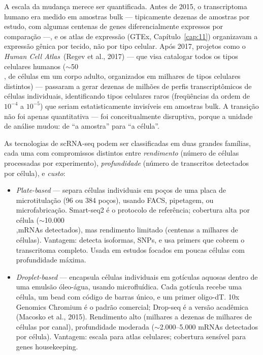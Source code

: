 A escala da mudança merece ser quantificada. Antes de 2015, o transcriptoma humano era medido em amostras bulk --- tipicamente dezenas de amostras por estudo, com algumas centenas de genes diferencialmente expressos por comparação ---, e os atlas de expressão (GTEx, Capítulo~\ref{cap:11}) organizavam a expressão gênica por tecido, não por tipo celular. Após 2017, projetos como o \emph{Human Cell Atlas}~(Regev et al., 2017) --- que visa catalogar todos os tipos celulares humanos (\(\sim\)50\\, de células em um corpo adulto, organizados em milhares de tipos celulares distintos) --- passaram a gerar dezenas de milhões de perfis transcriptômicos de células individuais, identificando tipos celulares raros (freqüências da ordem de \(10^{-4}\) a \(10^{-5}\)) que seriam estatisticamente invisíveis em amostras bulk. A transição não foi apenas quantitativa --- foi conceitualmente disruptiva, porque a unidade de análise mudou: de ``a amostra'' para ``a célula''.



As tecnologias de scRNA-seq podem ser classificadas em duas grandes famílias, cada uma com compromissos distintos entre \emph{rendimento} (número de células processadas por experimento), \emph{profundidade} (número de transcritos detectados por célula), e \emph{custo}:

\begin{definicaoenv}
\begin{itemize}
  \item \emph{Plate-based} --- separa células individuais em poços de uma placa de microtitulação (96 ou 384 poços), usando FACS, pipetagem, ou microfabricação. Smart-seq2 é o protocolo de referência; cobertura alta por célula (\(\sim\)10.000\\,mRNAs detectados), mas rendimento limitado (centenas a milhares de células). Vantagem: detecta isoformas, SNPs, e usa primers que cobrem o transcritoma completo. Usada em estudos focados em poucas células com profundidade máxima.
  \item \emph{Droplet-based} --- encapsula células individuais em gotículas aquosas dentro de uma emulsão óleo-água, usando microfluídica. Cada gotícula recebe uma célula, um bead com código de barras único, e um primer oligo-dT. 10x Genomics Chromium é o padrão comercial; Drop-seq é a versão acadêmica (Macosko et al., 2015). Rendimento alto (milhares a dezenas de milhares de células por canal), profundidade moderada (\(\sim\)2.000--5.000 mRNAs detectados por célula). Vantagem: escala para atlas celulares; cobertura sensível para genes housekeeping.
\end{itemize}
\end{definicaoenv}

